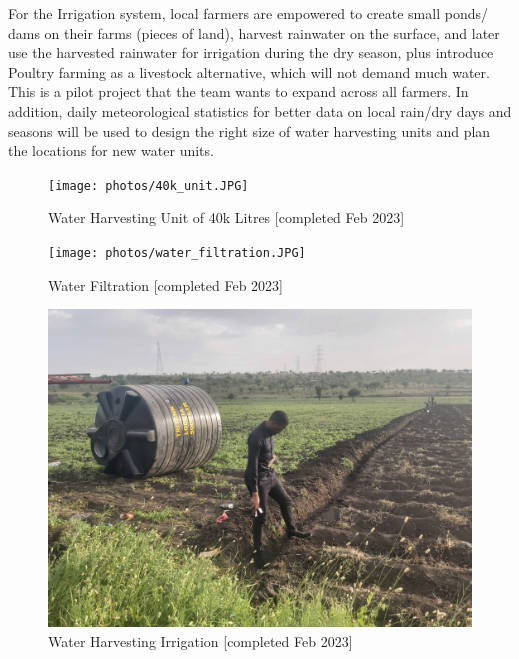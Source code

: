 \documentclass[10pt, twocolumn]{article}
\begin{document}
For the Irrigation system, local farmers are empowered to create small ponds/ dams on their farms (pieces of land), harvest rainwater on the surface, and later use the harvested rainwater for irrigation during the dry season, plus introduce Poultry farming as a livestock alternative, which will not demand much water. This is a pilot project that the team wants to expand across all farmers. In addition, daily meteorological statistics for better data on local rain/dry days and seasons will be used to design the right size of water harvesting units and plan the locations for new water units.

\begin{figure} [H]
    \centering
    \texttt{[image: photos/40k\_unit.JPG]}
    \caption{Water Harvesting Unit of 40k Litres [completed Feb 2023]}
    \label{fig:40k_unit}
\end{figure}


\begin{figure} [H]
    \centering
    \texttt{[image: photos/water\_filtration.JPG]}
    \caption{Water Filtration [completed Feb 2023]}
    \label{fig:filtration_unit}
\end{figure}


\begin{figure} [H]
    \centering
    \includegraphics[width=1\linewidth]{photos/Irrigation_Unit.jpg}
    \caption{Water Harvesting Irrigation [completed Feb 2023]}
    \label{fig:irrigation_unit}
\end{figure}
\end{document}
